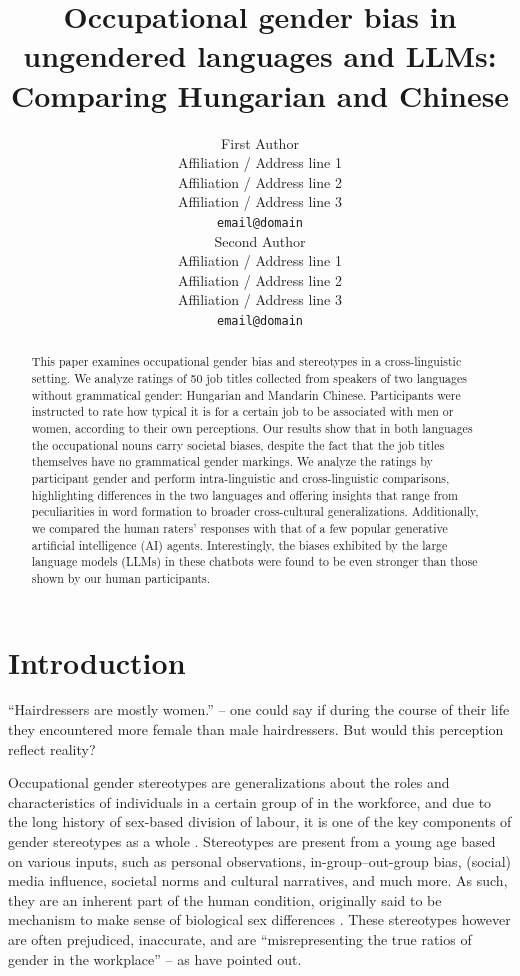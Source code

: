 \documentclass[11pt]{article}
\title{Occupational gender bias in ungendered languages and LLMs: Comparing Hungarian and Chinese}
\author{First Author \\
  Affiliation / Address line 1 \\
  Affiliation / Address line 2 \\
  Affiliation / Address line 3 \\
  \texttt{email@domain} \\\And
  Second Author \\
  Affiliation / Address line 1 \\
  Affiliation / Address line 2 \\
  Affiliation / Address line 3 \\
  \texttt{email@domain} \\}
\begin{document}
\maketitle

\begin{abstract}
This paper examines occupational gender bias and stereotypes in a cross-linguistic setting. We analyze ratings of 50 job titles collected from speakers of two languages without grammatical gender: Hungarian and Mandarin Chinese. Participants were instructed to rate how typical it is for a certain job to be associated with men or women, according to their own perceptions.
Our results show that in both languages the occupational nouns carry societal biases, despite the fact that the job titles themselves have no grammatical gender markings. We analyze the ratings by participant gender and perform intra-linguistic and cross-linguistic comparisons, highlighting differences in the two languages and offering insights that range from peculiarities in word formation to broader cross-cultural generalizations.
Additionally, we compared the human raters' responses with that of a few popular generative artificial intelligence (AI) agents. Interestingly, the biases exhibited by the large language models (LLMs) in these chatbots were found to be even stronger than those shown by our human participants.

\end{abstract}

\section{Introduction}

``Hairdressers are mostly women.'' -- one could say if during the course of their life they encountered more female than male hairdressers. But would this perception reflect reality?

Occupational gender stereotypes are generalizations about the roles and characteristics of individuals in a certain group of in the workforce, and due to the long history of sex-based division of labour, it is one of the key components of gender stereotypes as a whole \citep{deaux_1984_structure}. Stereotypes are present from a young age \citep{canessapollard_2022_development} based on various inputs, such as personal observations, in-group--out-group bias, (social) media influence, societal norms and cultural narratives, and much more. As such, they are an inherent part of the human condition, originally said to be mechanism to make sense of biological sex differences \citep{levanon_2016_persistence}. These stereotypes however are often prejudiced, inaccurate, and are ``misrepresenting the true ratios of gender in the workplace'' \citep{garnham_2015_true,gygax_2016_what} -- as \citet{kaukonen_2025_gender} have pointed out.
\end{document}
